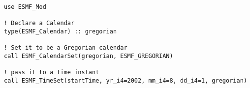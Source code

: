 
\begin{verbatim}
use ESMF_Mod

! Declare a Calendar
type(ESMF_Calendar) :: gregorian

! Set it to be a Gregorian calendar
call ESMF_CalendarSet(gregorian, ESMF_GREGORIAN)

! pass it to a time instant
call ESMF_TimeSet(startTime, yr_i4=2002, mm_i4=8, dd_i4=1, gregorian)
\end{verbatim}
